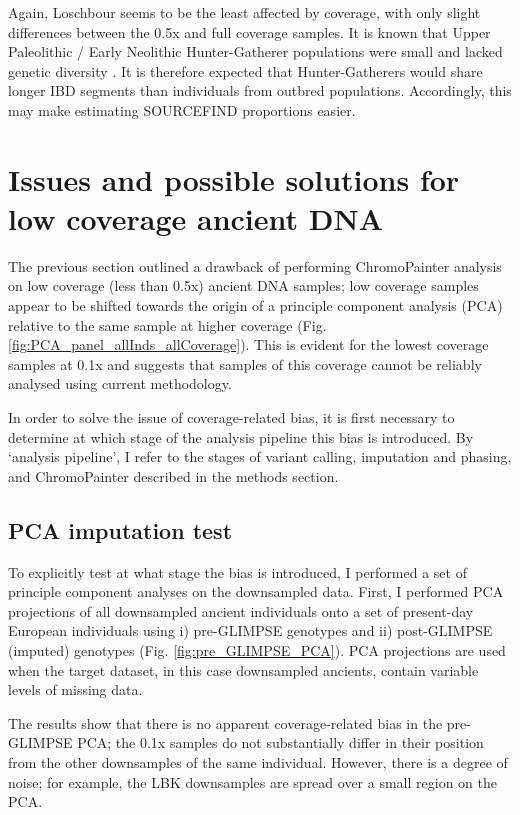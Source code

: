 Again, Loschbour seems to be the least affected by coverage, with only slight differences between the 0.5x and full coverage samples. It is known that Upper Paleolithic / Early Neolithic Hunter-Gatherer populations were small and lacked genetic diversity \cite{excoffier1999hunter, Lazaridis2014, Fu2016}. It is therefore expected that Hunter-Gatherers would share longer IBD segments than individuals from outbred populations. Accordingly, this may make estimating SOURCEFIND proportions easier.


\section{Issues and possible solutions for low coverage ancient DNA}

The previous section outlined a drawback of performing ChromoPainter analysis on low coverage (less than 0.5x) ancient DNA samples; low coverage samples appear to be shifted towards the origin of a principle component analysis (PCA) relative to the same sample at higher coverage (Fig. \ref{fig:PCA_panel_allInds_allCoverage}). This is evident for the lowest coverage samples at 0.1x and suggests that samples of this coverage cannot be reliably analysed using         current methodology.

In order to solve the issue of coverage-related bias, it is first necessary to determine at which stage of the analysis pipeline this bias is introduced. By `analysis pipeline', I refer to the stages of variant calling, imputation and phasing, and ChromoPainter described in the methods section.

\subsection{PCA imputation test}

To explicitly test at what stage the bias is introduced, I performed a set of principle component analyses on the downsampled data. First, I performed PCA projections of all downsampled ancient individuals onto a set of present-day European individuals using i) pre-GLIMPSE genotypes and ii) post-GLIMPSE (imputed) genotypes (Fig. \ref{fig:pre_GLIMPSE_PCA}). PCA projections are used when the target dataset, in this case downsampled ancients, contain variable levels of missing data.  

The results show that there is no apparent coverage-related bias in the pre-GLIMPSE PCA; the 0.1x samples do not substantially differ in their position from the other downsamples of the same individual. However, there is a degree of noise; for example, the LBK downsamples are spread over a small region on the PCA. 

